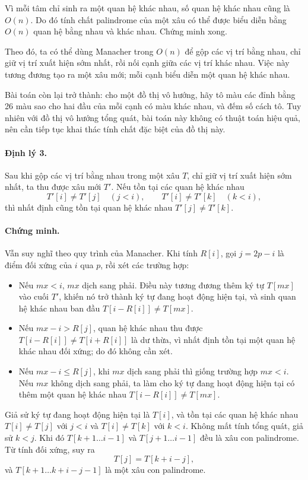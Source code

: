 \documentclass[11pt]{article}
\begin{document}
Vì mỗi tâm chỉ sinh ra một quan hệ khác nhau, số quan hệ khác nhau cũng là
\(O(n)\). Do đó tính chất palindrome của một xâu có thể được biểu diễn bằng
\(O(n)\) quan hệ bằng nhau và khác nhau. Chứng minh xong.

Theo đó, ta có thể dùng Manacher trong \(O(n)\) để gộp các vị trí bằng nhau,
chỉ giữ vị trí xuất hiện sớm nhất, rồi nối cạnh giữa các vị trí khác nhau. Việc
này tương đương tạo ra một xâu mới; mỗi cạnh biểu diễn một quan hệ khác nhau.

Bài toán còn lại trở thành: cho một đồ thị vô hướng, hãy tô màu các đỉnh bằng
26 màu sao cho hai đầu của mỗi cạnh có màu khác nhau, và đếm số cách tô. Tuy
nhiên với đồ thị vô hướng tổng quát, bài toán này không có thuật toán hiệu quả,
nên cần tiếp tục khai thác tính chất đặc biệt của đồ thị này.

\paragraph{Định lý 3.}
Sau khi gộp các vị trí bằng nhau trong một xâu \(T\), chỉ giữ vị trí xuất hiện
sớm nhất, ta thu được xâu mới \(T'\). Nếu tồn tại các quan hệ khác nhau
\[
  T'[i]\ne T'[j]\quad(j<i),\qquad T'[i]\ne T'[k]\quad(k<i),
\]
thì nhất định cũng tồn tại quan hệ khác nhau \(T'[j]\ne T'[k]\).

\paragraph{Chứng minh.}
Vẫn suy nghĩ theo quy trình của Manacher. Khi tính \(R[i]\), gọi \(j=2p-i\) là
điểm đối xứng của \(i\) qua \(p\), rồi xét các trường hợp:
\begin{itemize}
  \item Nếu \(mx<i\), \(mx\) dịch sang phải. Điều này tương đương thêm ký tự
  \(T[mx]\) vào cuối \(T'\), khiến nó trở thành ký tự đang hoạt động hiện tại,
  và sinh quan hệ khác nhau ban đầu \(T[i-R[i]]\ne T[mx]\).
  \item Nếu \(mx-i>R[j]\), quan hệ khác nhau thu được
  \(T[i-R[i]]\ne T[i+R[i]]\) là dư thừa, vì nhất định tồn tại một quan hệ khác
  nhau đối xứng; do đó không cần xét.
  \item Nếu \(mx-i\le R[j]\), khi \(mx\) dịch sang phải thì giống trường hợp
  \(mx<i\). Nếu \(mx\) không dịch sang phải, ta làm cho ký tự đang hoạt động
  hiện tại có thêm một quan hệ khác nhau \(T[i-R[i]]\ne T[mx]\).
\end{itemize}

Giả sử ký tự đang hoạt động hiện tại là \(T[i]\), và tồn tại các quan hệ khác
nhau \(T[i]\ne T[j]\) với \(j<i\) và \(T[i]\ne T[k]\) với \(k<i\). Không mất
tính tổng quát, giả sử \(k<j\). Khi đó \(T[k+1\ldots i-1]\) và
\(T[j+1\ldots i-1]\) đều là xâu con palindrome. Từ tính đối xứng, suy ra
\[
  T[j]=T[k+i-j],
\]
và \(T[k+1\ldots k+i-j-1]\) là một xâu con palindrome.
\end{document}

